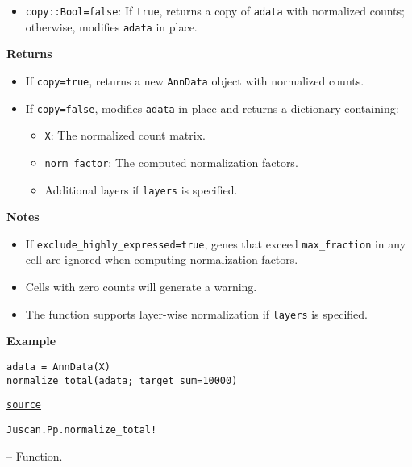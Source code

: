 \documentclass[oneside]{memoir}
\begin{document}
\begin{adjustwidth}{2em}{0pt}
\begin{itemize}
\item \texttt{copy::Bool=false}: If \texttt{true}, returns a copy of \texttt{adata} with normalized counts; otherwise, modifies \texttt{adata} in place.

\end{itemize}
\textbf{Returns}

\begin{itemize}
\item If \texttt{copy=true}, returns a new \texttt{AnnData} object with normalized counts.


\item If \texttt{copy=false}, modifies \texttt{adata} in place and returns a dictionary containing:

\begin{itemize}
\item \texttt{{\textquotedbl}X{\textquotedbl}}: The normalized count matrix.


\item \texttt{{\textquotedbl}norm\_factor{\textquotedbl}}: The computed normalization factors.


\item Additional layers if \texttt{layers} is specified.

\end{itemize}
\end{itemize}
\textbf{Notes}

\begin{itemize}
\item If \texttt{exclude\_highly\_expressed=true}, genes that exceed \texttt{max\_fraction} in any cell are ignored when computing normalization factors.


\item Cells with zero counts will generate a warning.


\item The function supports layer-wise normalization if \texttt{layers} is specified.

\end{itemize}
\textbf{Example}


\begin{verbatim}
adata = AnnData(X)
normalize_total(adata; target_sum=10000)
\end{verbatim}



\href{https://github.com/zehua0417/Juscan.jl/blob/393ad1b827b678ea98a738f92af658ee9ed9a403/src/preprocessing/normalization.jl#L30-L73}{\texttt{source}}


\end{adjustwidth}
\hypertarget{13118707542266310213}{\texttt{Juscan.Pp.normalize\_total!}}  -- {Function.}
\end{document}
